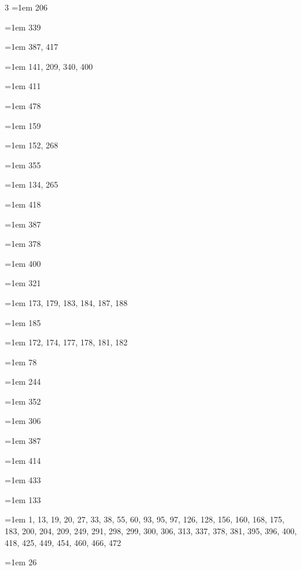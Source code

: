 \begin{multicols}{3}
\hangindent=1em  206\par
\hangindent=1em  339\par
\hangindent=1em  387, 417\par
\hangindent=1em  141, 209, 340, 400\par
\hangindent=1em  411\par
\hangindent=1em  478\par
\hangindent=1em  159\par
\hangindent=1em  152, 268\par
\hangindent=1em  355\par
\hangindent=1em  134, 265\par
\hangindent=1em  418\par
\hangindent=1em  387\par
\hangindent=1em  378\par
\hangindent=1em  400\par
\hangindent=1em  321\par
\hangindent=1em  173, 179, 183, 184, 187, 188\par
\hangindent=1em  185\par
\hangindent=1em  172, 174, 177, 178, 181, 182\par
\hangindent=1em  78\par
\hangindent=1em  244\par
\hangindent=1em  352\par
\hangindent=1em  306\par
\hangindent=1em  387\par
\hangindent=1em  414\par
\hangindent=1em  433\par
\hangindent=1em  133\par
\hangindent=1em  1, 13, 19, 20, 27, 33, 38, 55, 60, 93, 95, 97, 126, 128, 156, 160, 168, 175, 183, 200, 204, 209, 249, 291, 298, 299, 300, 306, 313, 337, 378, 381, 395, 396, 400, 418, 425, 449, 454, 460, 466, 472\par
\hangindent=1em  26\par

\end{multicols}
